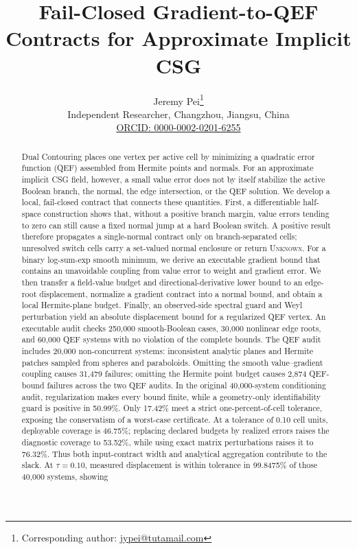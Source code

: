 \documentclass[11pt]{article}
\title{Fail-Closed Gradient-to-QEF Contracts for Approximate Implicit CSG}
\author{Jeremy Pei\thanks{Corresponding author: \href{mailto:jypei@tutamail.com}{jypei@tutamail.com}}\\
Independent Researcher, Changzhou, Jiangsu, China\\
\href{https://orcid.org/0000-0002-0201-6255}{ORCID: 0000-0002-0201-6255}}
\date{}
\theoremstyle{definition}
\newcommand{\Unknown}{\textsc{Unknown}}
\begin{document}
\maketitle

\begin{abstract}
Dual Contouring places one vertex per active cell by minimizing a quadratic
error function (QEF) assembled from Hermite points and normals.  For an
approximate implicit CSG field, however, a small value error does not by itself
stabilize the active Boolean branch, the normal, the edge intersection, or the
QEF solution.  We develop a local, fail-closed contract that connects these
quantities.  First, a differentiable half-space construction shows that,
without a positive branch margin, value errors tending to zero can still cause
a fixed normal jump at a hard Boolean switch.  A positive result therefore
propagates a single-normal contract only on branch-separated cells; unresolved
switch cells carry a set-valued normal enclosure or return \Unknown.  For a
binary log-sum-exp smooth minimum, we derive an executable gradient bound that
contains an unavoidable coupling from value error to weight and gradient
error.  We then transfer a field-value budget and directional-derivative lower
bound to an edge-root displacement, normalize a gradient contract into a
normal bound, and obtain a local Hermite-plane budget.  Finally, an
observed-side spectral guard and Weyl perturbation yield an absolute
displacement bound for a regularized QEF vertex.  An executable audit checks
250,000 smooth-Boolean cases, 30,000 nonlinear edge roots, and 60,000 QEF
systems with no violation of the complete bounds.  The QEF audit includes
20,000 non-concurrent systems: inconsistent analytic planes and Hermite
patches sampled from spheres and paraboloids.  Omitting the smooth
value--gradient coupling causes 31,479 failures; omitting the Hermite point
budget causes 2,874 QEF-bound failures across the two QEF audits.  In the
original 40,000-system conditioning audit, regularization makes every bound
finite, while a geometry-only identifiability guard is positive in 50.99\%.
Only 17.42\% meet a strict one-percent-of-cell tolerance,
exposing the conservatism of a worst-case certificate.  At a tolerance of
0.10 cell units, deployable coverage is 46.75\%; replacing declared budgets by
realized errors raises the diagnostic coverage to 53.52\%, while using exact
matrix perturbations raises it to 76.32\%.  Thus both input-contract width and
analytical aggregation contribute to the slack.  At \(\tau=0.10\), measured
displacement is within tolerance in 99.8475\% of those 40,000 systems, showing

\end{abstract}
\end{document}
